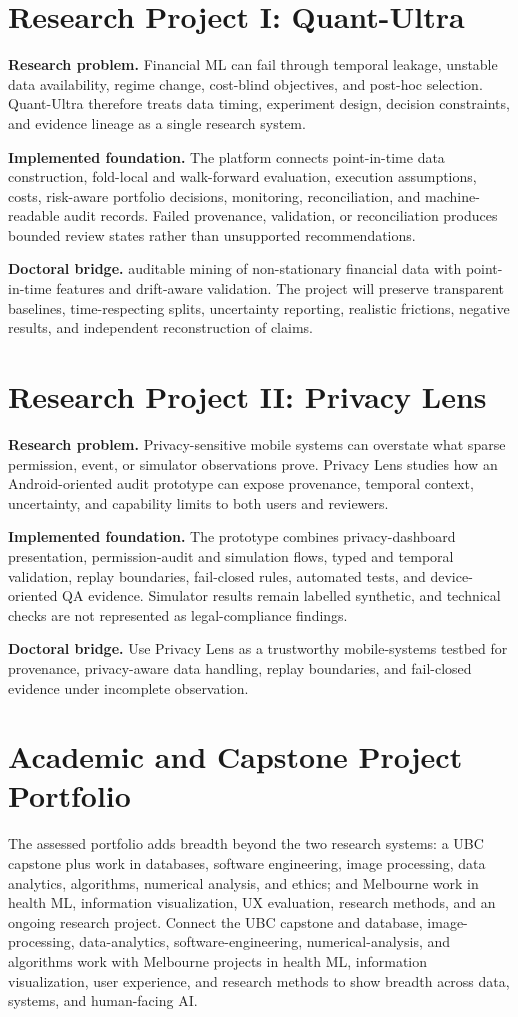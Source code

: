 \documentclass[11pt]{article}
\begin{document}
\section*{Research Project I: Quant-Ultra}
\textbf{Research problem.} Financial ML can fail through temporal leakage, unstable data availability, regime change, cost-blind objectives, and post-hoc selection. Quant-Ultra therefore treats data timing, experiment design, decision constraints, and evidence lineage as a single research system.

\textbf{Implemented foundation.} The platform connects point-in-time data construction, fold-local and walk-forward evaluation, execution assumptions, costs, risk-aware portfolio decisions, monitoring, reconciliation, and machine-readable audit records. Failed provenance, validation, or reconciliation produces bounded review states rather than unsupported recommendations.

\textbf{Doctoral bridge.} auditable mining of non-stationary financial data with point-in-time features and drift-aware validation. The project will preserve transparent baselines, time-respecting splits, uncertainty reporting, realistic frictions, negative results, and independent reconstruction of claims.

\section*{Research Project II: Privacy Lens}
\textbf{Research problem.} Privacy-sensitive mobile systems can overstate what sparse permission, event, or simulator observations prove. Privacy Lens studies how an Android-oriented audit prototype can expose provenance, temporal context, uncertainty, and capability limits to both users and reviewers.

\textbf{Implemented foundation.} The prototype combines privacy-dashboard presentation, permission-audit and simulation flows, typed and temporal validation, replay boundaries, fail-closed rules, automated tests, and device-oriented QA evidence. Simulator results remain labelled synthetic, and technical checks are not represented as legal-compliance findings.

\textbf{Doctoral bridge.} Use Privacy Lens as a trustworthy mobile-systems testbed for provenance, privacy-aware data handling, replay boundaries, and fail-closed evidence under incomplete observation.

\section*{Academic and Capstone Project Portfolio}
The assessed portfolio adds breadth beyond the two research systems: a UBC capstone plus work in databases, software engineering, image processing, data analytics, algorithms, numerical analysis, and ethics; and Melbourne work in health ML, information visualization, UX evaluation, research methods, and an ongoing research project. Connect the UBC capstone and database, image-processing, data-analytics, software-engineering, numerical-analysis, and algorithms work with Melbourne projects in health ML, information visualization, user experience, and research methods to show breadth across data, systems, and human-facing AI.
\end{document}
